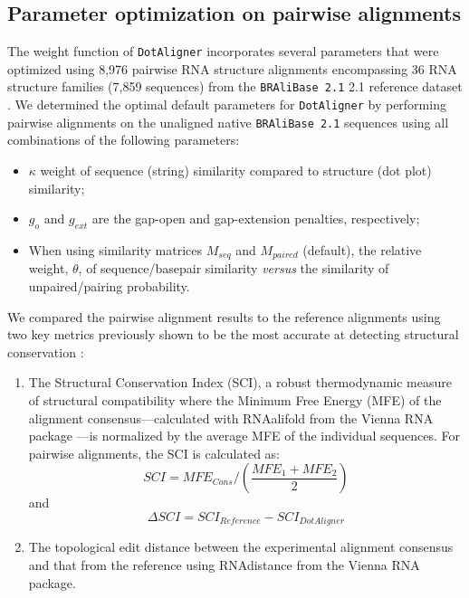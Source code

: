 \documentclass[a4paper,twoside]{article}
\newcommand\dotaligner{\texttt{DotAligner}}
\newcommand\bralibase{\texttt{BRAliBase 2.1}}
\begin{document}
\subsection{Parameter optimization on pairwise alignments}
The weight function of \dotaligner{} incorporates several parameters that were 
optimized using  8,976 pairwise RNA structure alignments encompassing 36 RNA 
structure families (7,859 sequences) from the  \bralibase{} 2.1 reference dataset 
\cite{Wilm2006enhanced}. We determined the optimal default parameters for 
\dotaligner{} by performing pairwise alignments on the unaligned native \bralibase{} 
sequences using all combinations of the following parameters:
\begin{itemize}
	\item $\kappa$ weight of sequence (string) similarity compared to structure 
	(dot plot) similarity;
	\item $g_o$ and $g_{ext}$ are the gap-open and gap-extension penalties, 
	respectively;
	\item When using similarity matrices $M_{seq}$ and $M_{paired}$ (default), 
	the relative weight, $\theta$, of sequence/basepair similarity \textit{versus} 
	the similarity of unpaired/pairing probability.
\end{itemize}

\noindent We compared the pairwise alignment results to the reference alignments 
using two key metrics previously shown to be the most accurate at detecting 
structural conservation \cite{gruber2008strategies}: 
 \begin{enumerate}
\item  The Structural Conservation Index (SCI), a robust thermodynamic measure 
of structural compatibility where the Minimum Free Energy (MFE) of the alignment 
consensus---calculated with RNAalifold from the Vienna RNA package 
\cite{lorenz2011viennarna}---is normalized by the average MFE of the individual 
sequences. For pairwise alignments, the SCI is calculated as:
\begin{equation}\label{sci}
	SCI =  MFE_{Cons} /  \left( \frac{ MFE_1 + MFE_2 }{ 2} \right)   
\end{equation} 
and 	
\begin{equation}\label{dsci}
	\Delta SCI = SCI_{Reference} - SCI_{DotAligner}
\end{equation} 
 \item  The topological edit distance between the experimental alignment consensus 
 and that from the reference using RNAdistance from the Vienna RNA package. 
 \end{enumerate}
\end{document}
